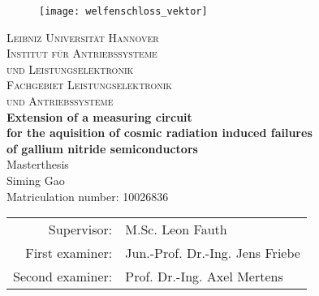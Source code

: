 \begin{titlepage}
\enlargethispage{2.0cm}

\begin{center}

\vspace*{-2cm}


   \begin{figure}[h]
   \centering
       \texttt{[image: welfenschloss\_vektor]}
   \end{figure}

\vspace{1cm}

    {\LARGE \textsc{Leibniz Universität Hannover}}\\[1.0cm]

    {\Large \textsc{Institut für Antriebssysteme}} \\[0.2cm]
    {\Large \textsc{und Leistungselektronik}} \\ [0.4cm]

    {\Large \textsc{Fachgebiet Leistungselektronik}} \\ [0.2cm]
		{\Large \textsc{und Antriebssysteme}} \\ [1.7cm]

    {\Large \textbf{Extension of a measuring circuit \\[0.3cm] for the aquisition of cosmic radiation induced failures\\[0.3cm] of  gallium nitride semiconductors} } \\ [3cm]
    {\Large Masterthesis} \\ [1.5cm]

    {\large Siming Gao} \\
    {Matriculation number: 10026836 } \\ [1.5cm]

    \begin{tabular}{rl}
      Supervisor:    & M.Sc. Leon Fauth\\
      First examiner:  & Jun.-Prof. Dr.-Ing. Jens Friebe\\
      Second examiner: & Prof. Dr.-Ing. Axel Mertens
    \end{tabular}

\end{center}

\end{titlepage}
